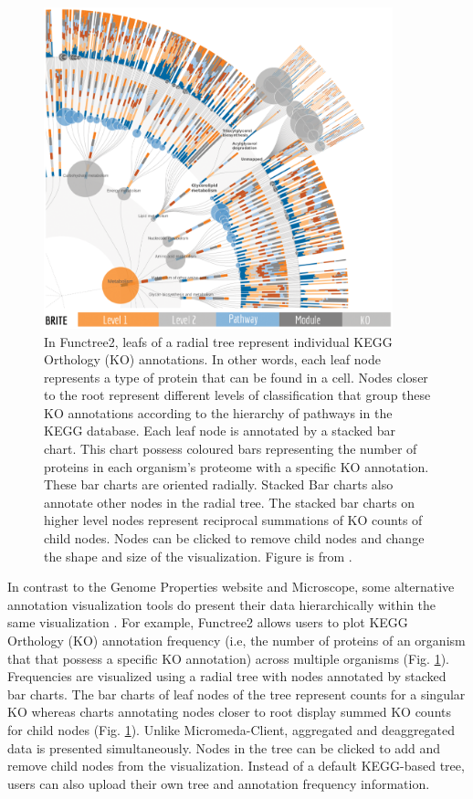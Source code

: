 \begin{figure}[!ht]
  \centering
	\includegraphics[width=0.9\textwidth]{media/functree2.png}
	 \caption{In Functree2, leafs of a radial tree represent individual KEGG Orthology (KO) annotations. In other words, each leaf node represents a type of protein that can be found in a cell. Nodes closer to the root represent different levels of classification that group these KO annotations according to the hierarchy of pathways in the KEGG database. Each leaf node is annotated by a stacked bar chart. This chart possess coloured bars representing the number of proteins in each organism's proteome with a specific KO annotation. These bar charts are oriented radially. Stacked Bar charts also annotate other nodes in the radial tree. The stacked bar charts on higher level nodes represent reciprocal summations of KO counts of child nodes. Nodes can be clicked to remove child nodes and change the shape and size of the visualization. Figure is from \cite{darzi2019functree2}.}
	 \label{fig:functree2}
\end{figure}

In contrast to the Genome Properties website and Microscope, some alternative annotation visualization tools do present their data hierarchically within the same visualization \cite{darzi2019functree2}. For example, Functree2 \cite{darzi2019functree2} allows users to plot KEGG Orthology (KO) annotation \cite{mao2005automated,kanehisa2011kegg} frequency (i.e, the number of proteins of an organism that that possess a specific KO annotation) across multiple organisms (Fig. \ref{fig:functree2}). Frequencies are visualized using a radial tree with nodes annotated by stacked bar charts. The bar charts of leaf nodes of the tree represent counts for a singular KO whereas charts annotating nodes closer to root display summed KO counts for child nodes (Fig. \ref{fig:functree2}). Unlike Micromeda-Client, aggregated and deaggregated data is presented simultaneously. Nodes in the tree can be clicked to add and remove child nodes from the visualization. Instead of a default KEGG-based tree, users can also upload their own tree and annotation frequency information.

